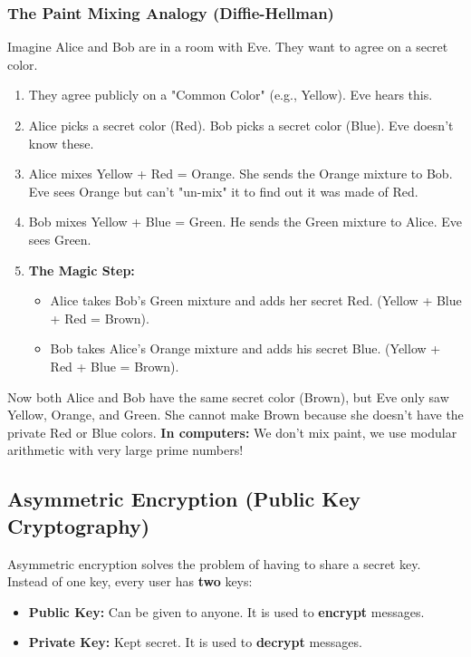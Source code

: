 \documentclass[11pt,a4paper]{report}
\begin{document}
\subsubsection{The Paint Mixing Analogy (Diffie-Hellman)}
Imagine Alice and Bob are in a room with Eve. They want to agree on a secret color.
\begin{enumerate}
    \item They agree publicly on a "Common Color" (e.g., Yellow). Eve hears this.
    \item Alice picks a secret color (Red). Bob picks a secret color (Blue). Eve doesn't know these.
    \item Alice mixes Yellow + Red = Orange. She sends the Orange mixture to Bob. Eve sees Orange but can't "un-mix" it to find out it was made of Red.
    \item Bob mixes Yellow + Blue = Green. He sends the Green mixture to Alice. Eve sees Green.
    \item \textbf{The Magic Step:}
    \begin{itemize}
        \item Alice takes Bob's Green mixture and adds her secret Red. (Yellow + Blue + Red = Brown).
        \item Bob takes Alice's Orange mixture and adds his secret Blue. (Yellow + Red + Blue = Brown).
    \end{itemize}
\end{enumerate}
Now both Alice and Bob have the same secret color (Brown), but Eve only saw Yellow, Orange, and Green. She cannot make Brown because she doesn't have the private Red or Blue colors.
\textbf{In computers:} We don't mix paint, we use modular arithmetic with very large prime numbers!

\subsection{Asymmetric Encryption (Public Key Cryptography)}
Asymmetric encryption solves the problem of having to share a secret key. Instead of one key, every user has \textbf{two} keys:
\begin{itemize}
    \item \textbf{Public Key:} Can be given to anyone. It is used to \textbf{encrypt} messages.
    \item \textbf{Private Key:} Kept secret. It is used to \textbf{decrypt} messages.
\end{itemize}
\end{document}
